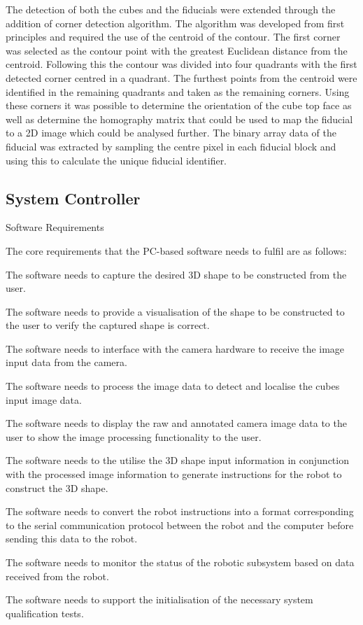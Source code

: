 The detection of both the cubes and the fiducials were extended through the addition of corner detection algorithm. The algorithm was developed from first principles and required the use of the centroid of the contour. The first corner was selected as the contour point with the greatest Euclidean distance from the centroid. Following this the contour was divided into four quadrants with the first detected corner centred in a quadrant. The furthest points from the centroid were identified in the remaining quadrants and taken as the remaining corners. Using these corners it was possible to determine the orientation of the cube top face as well as determine the homography matrix that could be used to map the fiducial to a 2D image which could be analysed further. The binary array data of the fiducial was extracted by sampling the centre pixel in each fiducial block and using this to calculate the unique fiducial identifier. 

\subsection{System Controller}

Software Requirements

The core requirements that the PC-based software needs to fulfil are as follows:

\begin{compactitem}
	\item The software needs to capture the desired 3D shape to be constructed from the user.
	\item The software needs to provide a visualisation of the shape to be constructed to the user to verify the captured shape is correct.
	\item The software needs to interface with the camera hardware to receive the image input data from the camera.
	\item The software needs to process the image data to detect and localise the cubes input image data.
	\item The software needs to display the raw and annotated camera image data to the user to show the image processing functionality to the user.
	\item The software needs to the utilise the 3D shape input information in conjunction with the processed image information to generate instructions for the robot to construct the 3D shape.
	\item The software needs to convert the robot instructions into a format corresponding to the serial communication protocol between the robot and the computer before sending this data to the robot.
	\item The software needs to monitor the status of the robotic subsystem based on data received from the robot.
	\item The software needs to support the initialisation of the necessary system qualification tests.
\end{compactitem}

